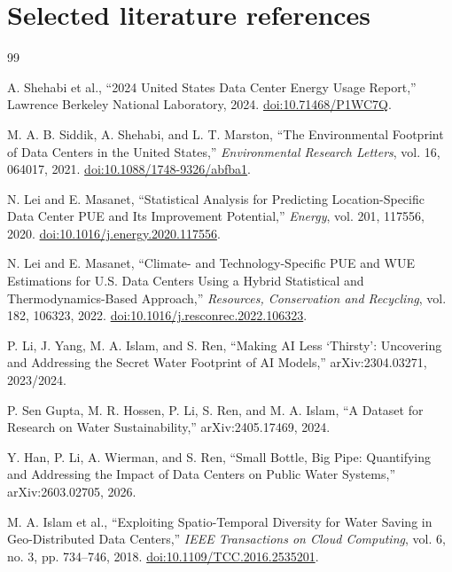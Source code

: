 \documentclass[11pt]{article}
\begin{document}
\section{Selected literature references}


\begin{thebibliography}{99}\small

A. Shehabi et al.,
``2024 United States Data Center Energy Usage Report,''
Lawrence Berkeley National Laboratory, 2024.
\href{https://doi.org/10.71468/P1WC7Q}{doi:10.71468/P1WC7Q}.

M. A. B. Siddik, A. Shehabi, and L. T. Marston,
``The Environmental Footprint of Data Centers in the United States,''
\emph{Environmental Research Letters}, vol. 16, 064017, 2021.
\href{https://doi.org/10.1088/1748-9326/abfba1}{doi:10.1088/1748-9326/abfba1}.

N. Lei and E. Masanet,
``Statistical Analysis for Predicting Location-Specific Data Center PUE and Its Improvement Potential,''
\emph{Energy}, vol. 201, 117556, 2020.
\href{https://doi.org/10.1016/j.energy.2020.117556}{doi:10.1016/j.energy.2020.117556}.

N. Lei and E. Masanet,
``Climate- and Technology-Specific PUE and WUE Estimations for U.S. Data Centers Using a Hybrid Statistical and Thermodynamics-Based Approach,''
\emph{Resources, Conservation and Recycling}, vol. 182, 106323, 2022.
\href{https://doi.org/10.1016/j.resconrec.2022.106323}{doi:10.1016/j.resconrec.2022.106323}.

P. Li, J. Yang, M. A. Islam, and S. Ren,
``Making AI Less `Thirsty': Uncovering and Addressing the Secret Water Footprint of AI Models,''
arXiv:2304.03271, 2023/2024.

P. Sen Gupta, M. R. Hossen, P. Li, S. Ren, and M. A. Islam,
``A Dataset for Research on Water Sustainability,''
arXiv:2405.17469, 2024.

Y. Han, P. Li, A. Wierman, and S. Ren,
``Small Bottle, Big Pipe: Quantifying and Addressing the Impact of Data Centers on Public Water Systems,''
arXiv:2603.02705, 2026.

M. A. Islam et al.,
``Exploiting Spatio-Temporal Diversity for Water Saving in Geo-Distributed Data Centers,''
\emph{IEEE Transactions on Cloud Computing}, vol. 6, no. 3, pp. 734--746, 2018.
\href{https://doi.org/10.1109/TCC.2016.2535201}{doi:10.1109/TCC.2016.2535201}.


\end{thebibliography}
\end{document}
